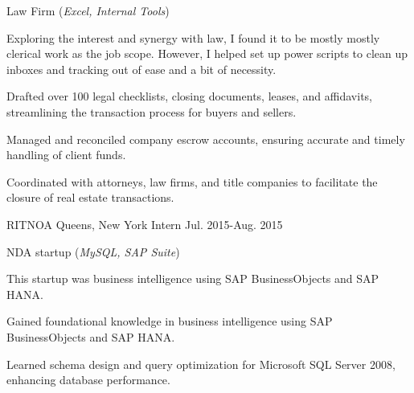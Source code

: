 \begin{cventries}
  \cvcustombodydescription
    {Law Firm (\emph{Excel, Internal Tools})}
    {
      \begin{cvtightprose} %
        {Exploring the interest and synergy with law, I found it to be mostly mostly clerical work as the job scope. However, I helped set up power scripts to clean up inboxes and tracking out of ease and a bit of necessity.}
      \end{cvtightprose}
    }
    {
      \begin{cvitems} %
        \item {Drafted over 100 legal checklists, closing documents, leases, and affidavits, streamlining the transaction process for buyers and sellers.}
        \item {Managed and reconciled company escrow accounts, ensuring accurate and timely handling of client funds.}
        \item {Coordinated with attorneys, law firms, and title companies to facilitate the closure of real estate transactions.}
      \end{cvitems}
    }

  \nrolecventrynoitems
    {RITNOA} %
    {Queens, New York} %
    {Intern} %
    {Jul. 2015-Aug. 2015} %
    {} %
    {} %
    {} %
    {} %

  \cvcustombodydescription
    {NDA startup (\emph{MySQL, SAP Suite})}
    {
      \begin{cvtightprose} %
        {This startup was business intelligence using SAP BusinessObjects and SAP HANA.}
      \end{cvtightprose}
    }
    {
      \begin{cvitems} %
        \item {Gained foundational knowledge in business intelligence using SAP BusinessObjects and SAP HANA.}
        \item {Learned schema design and query optimization for Microsoft SQL Server 2008, enhancing database performance.}
      \end{cvitems}
    }

\end{cventries}
